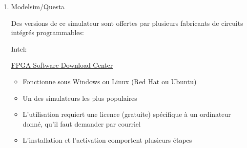\documentclass[letter, oneside]{book}
\begin{document}
\begin{enumerate}
\item Modelsim/Questa
\label{sec:orgfdbcd53}

Des versions de ce simulateur sont offertes par plusieurs fabricants
de circuits intégrés programmables:

Intel: 

\href{https://www.intel.com/content/www/us/en/collections/products/fpga/software/downloads.html?s=Newest\&f=\%255B\%257B\%2522name\%2522\%3A\%2522quartusedition\%2522\%2C\%2522facetId\%2522\%3A\%2522quartusedition\%2522\%2C\%2522currentValues\%2522\%3A\%255B\%255D\%257D\%2C\%257B\%2522name\%2522\%3A\%2522quartusaddon\%2522\%2C\%2522facetId\%2522\%3A\%2522quartusaddon\%2522\%2C\%2522currentValues\%2522\%3A\%255B\%257B\%2522value\%2522\%3A\%2522Intel\%25C2\%25AE\%2520FPGA\%2520Simulation\%2520Tools\%2522\%2C\%2522state\%2522\%3A\%2522idle\%2522\%2C\%2522children\%2522\%3A\%255B\%257B\%2522value\%2522\%3A\%2522Questa*-Intel\%25C2\%25AE\%2520FPGA\%2520Starter\%2520Edition\%2522\%2C\%2522state\%2522\%3A\%2522selected\%2522\%257D\%255D\%257D\%255D\%257D\%2C\%257B\%2522name\%2522\%3A\%2522fpgadevicefamily\%2522\%2C\%2522facetId\%2522\%3A\%2522fpgadevicefamily\%2522\%2C\%2522currentValues\%2522\%3A\%255B\%255D\%257D\%2C\%257B\%2522name\%2522\%3A\%2522fpgaplatform\%2522\%2C\%2522facetId\%2522\%3A\%2522fpgaplatform\%2522\%2C\%2522currentValues\%2522\%3A\%255B\%255D\%257D\%2C\%257B\%2522facetId\%2522\%3A\%2522os-rdc\%2522\%2C\%2522name\%2522\%3A\%2522OperatingSystem\%2522\%2C\%2522currentValues\%2522\%3A\%255B\%255D\%257D\%2C\%257B\%2522facetId\%2522\%3A\%2522\%40emtcontenttype\_en\%2522\%2C\%2522name\%2522\%3A\%2522ContentType\%2522\%2C\%2522currentValues\%2522\%3A\%255B\%255D\%257D\%2C\%257B\%2522facetId\%2522\%3A\%2522lastupdated-rdc\%2522\%2C\%2522name\%2522\%3A\%2522lastupdated\%2522\%2C\%2522currentValues\%2522\%3A\%255B\%255D\%257D\%255D\&q=lite}{FPGA Software Download Center}


\begin{itemize}
\item Fonctionne sous Windows ou Linux (Red Hat ou Ubuntu)
\item Un des simulateurs les plus populaires
\item L'utilisation requiert une licence (gratuite) spécifique à un
ordinateur donné, qu'il faut demander par courriel
\item L'installation et l'activation comportent plusieurs étapes
\end{itemize}



\end{enumerate}
\end{document}
